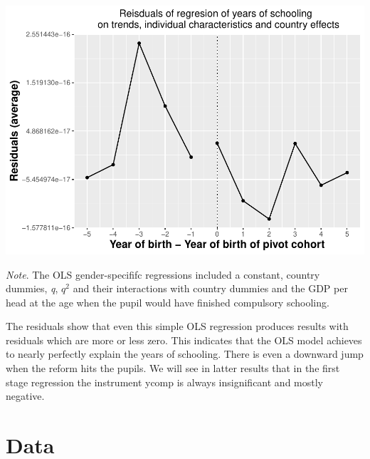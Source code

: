 \documentclass[12pt,a4paper]{article}
\let\origfigure\figure
\let\endorigfigure\endfigure
\renewenvironment{figure}[1][2] {
    \expandafter\origfigure\expandafter[H]
} {
    \endorigfigure
}
\begin{document}
\begin{figure}
\centering
\includegraphics{term_paper_eem_files/figure-latex/unnamed-chunk-1-1.pdf}
\caption{\emph{The Effect of School Reforms on Educational Attainment}}
\end{figure}

\textit{Note}. The OLS gender-specififc regressions included a constant,
country dummies, \textit{q}, \textit{$q^2$} and their interactions with
country dummies and the GDP per head at the age when the pupil would
have finished compulsory schooling.

The residuals show that even this simple OLS regression produces results
with residuals which are more or less zero. This indicates that the OLS
model achieves to nearly perfectly explain the years of schooling. There
is even a downward jump when the reform hits the pupils. We will see in
latter results that in the first stage regression the instrument ycomp
is always insignificant and mostly negative.

\hypertarget{data}{%
\section{Data}\label{data}}
\end{document}
